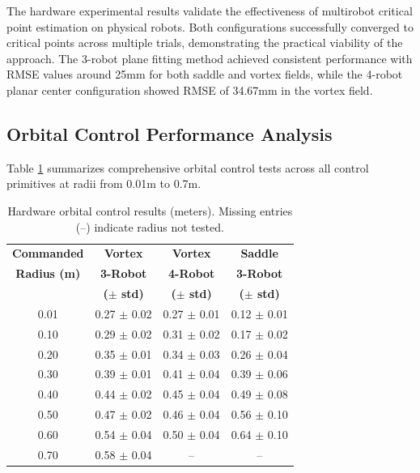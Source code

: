 \documentclass[lettersize,journal]{IEEEtran}
\begin{document}
    The hardware experimental results validate the effectiveness of multirobot critical point estimation on physical robots. Both configurations successfully converged to critical points across multiple trials, demonstrating the practical viability of the approach. The 3-robot plane fitting method achieved consistent performance with RMSE values around 25mm for both saddle and vortex fields, while the 4-robot planar center configuration showed RMSE of 34.67mm in the vortex field.

\subsection{Orbital Control Performance Analysis}

Table \ref{tab:orbital_radius_comparison} summarizes comprehensive orbital control tests across all control primitives at radii from 0.01m to 0.7m.


\begin{table}[h]
    \centering
    \begin{tabular}{cccc}
    \hline
    \textbf{Commanded} & \textbf{Vortex} & \textbf{Vortex} & \textbf{Saddle} \\
    \textbf{Radius (m)} & \textbf{3-Robot} & \textbf{4-Robot} & \textbf{3-Robot} \\
     & \textbf{($\pm$ std)} & \textbf{($\pm$ std)} & \textbf{($\pm$ std)} \\
    \hline
    0.01 & 0.27 $\pm$ 0.02 & 0.27 $\pm$ 0.01 & 0.12 $\pm$ 0.01 \\
    0.10 & 0.29 $\pm$ 0.02 & 0.31 $\pm$ 0.02 & 0.17 $\pm$ 0.02 \\
    0.20 & 0.35 $\pm$ 0.01 & 0.34 $\pm$ 0.03 & 0.26 $\pm$ 0.04 \\
    0.30 & 0.39 $\pm$ 0.01 & 0.41 $\pm$ 0.04 & 0.39 $\pm$ 0.06 \\
    0.40 & 0.44 $\pm$ 0.02 & 0.45 $\pm$ 0.04 & 0.49 $\pm$ 0.08 \\
    0.50 & 0.47 $\pm$ 0.02 & 0.46 $\pm$ 0.04 & 0.56 $\pm$ 0.10 \\
    0.60 & 0.54 $\pm$ 0.04 & 0.50 $\pm$ 0.04 & 0.64 $\pm$ 0.10 \\
    0.70 & 0.58 $\pm$ 0.04 & -- & -- \\
    \hline
    \end{tabular}
    \caption{Hardware orbital control results (meters). Missing entries (--) indicate radius not tested.}
    \label{tab:orbital_radius_comparison}
    \end{table}
\end{document}
